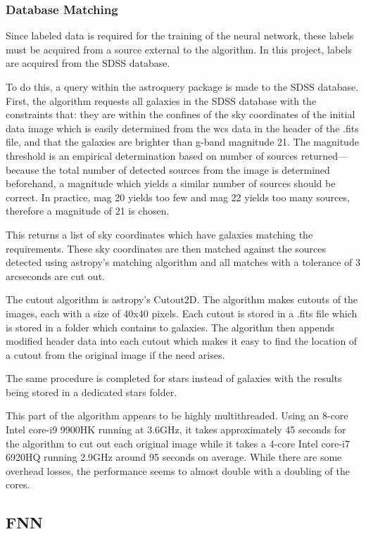 \documentclass[a4paper,fleqn,usenatbib]{mnras}
\begin{document}
\subsubsection{Database Matching}
Since labeled data is required for the training of the neural network, these labels must be acquired from a source external to the algorithm. In this project, labels are acquired from the SDSS database. 

To do this, a query within the astroquery package is made to the SDSS database. First, the algorithm requests all galaxies in the SDSS database with the constraints that: they are within the confines of the sky coordinates of the initial data image which is easily determined from the wcs data in the header of the .fits file, and that the galaxies are brighter than g-band magnitude 21. The magnitude threshold is an empirical determination based on number of sources returned---because the total number of detected sources from the image is determined beforehand, a magnitude which yields a similar number of sources should be correct. In practice, mag 20 yields too few and mag 22 yields too many sources, therefore a magnitude of 21 is chosen. 

This returns a list of sky coordinates which have galaxies matching the requirements. These sky coordinates are then matched against the sources detected using astropy's matching algorithm and all matches with a tolerance of 3 arcseconds are cut out. 

The cutout algorithm is astropy's Cutout2D. The algorithm makes cutouts of the images, each with a size of 40x40 pixels. Each cutout is stored in a .fits file which is stored in a folder which contains to galaxies. The algorithm then appends modified header data into each cutout which makes it easy to find the location of a cutout from the original image if the need arises. 

The same procedure is completed for stars instead of galaxies with the results being stored in a dedicated stars folder. 

This part of the algorithm appears to be highly multithreaded. Using an 8-core Intel core-i9 9900HK running at 3.6GHz, it takes approximately 45 seconds for the algorithm to cut out each original image while it takes a 4-core Intel core-i7 6920HQ running 2.9GHz around 95 seconds on average. While there are some overhead losses, the performance seems to almost double with a doubling of the cores.
\subsection{FNN}
\end{document}
